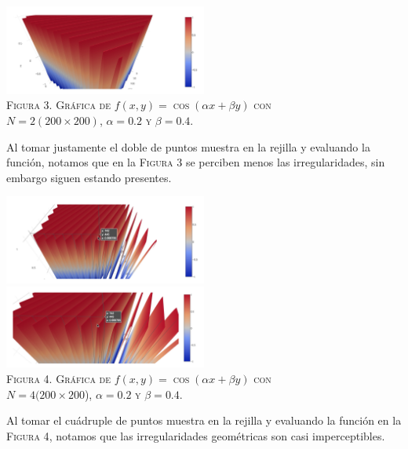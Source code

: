 \documentclass[a4paper]{article}
\begin{document}
\begin{center}
\includegraphics[width=0.5\textwidth]{g2}\\
\textsc{Figura 3. Gráfica de $f(x, y) = \cos(\alpha x + \beta y)$ con \\$N = 2(200\times 200)$, $\alpha = 0.2$ y $\beta = 0.4$.}
\end{center}
Al tomar justamente el doble de puntos muestra en la rejilla y evaluando la función, notamos que en la \textsc{Figura 3} se perciben menos las irregularidades, sin embargo siguen estando presentes.\\

\begin{center}
\includegraphics[width=0.5\textwidth]{g3}\\
\includegraphics[width=0.5\textwidth]{g4}\\
\textsc{Figura 4. Gráfica de $f(x, y) = \cos(\alpha x + \beta y)$ con \\$N = 4(200\times 200$), $\alpha = 0.2$ y $\beta = 0.4$.}
\end{center}
Al tomar el cuádruple de puntos muestra en la rejilla y evaluando la función en la \textsc{Figura 4}, notamos que las irregularidades geométricas son casi imperceptibles.\\
\end{document}
